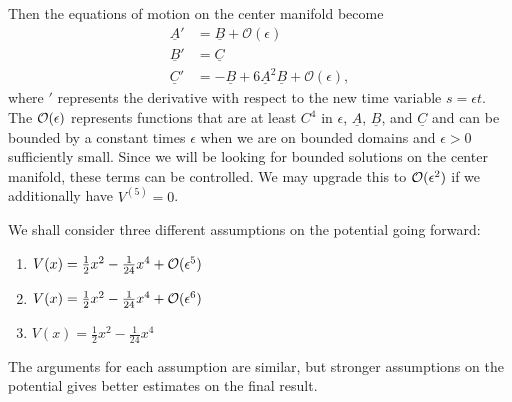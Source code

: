 Then the equations of motion on the center manifold become
\begin{equation}\label{eqns-center-manifold}
\begin{aligned}
	\underline A ' &= \underline B + \mathcal O(\epsilon) \\
	\underline B ' &= \underline C \\
	\underline C ' &= - \underline B + 6 \underline A^2 \underline B + \mathcal O(\epsilon),
\end{aligned}
\end{equation}
where \('\) represents the derivative with respect to the new time variable \(s = \epsilon t\). The \(\mathcal{O}(\epsilon)\) represents functions that are at least \(C^4\) in \(\epsilon\), \(\underline A\), \(\underline B\), and \(\underline C\) and can be bounded by a constant times \(\epsilon\) when we are on bounded domains and \(\epsilon >0\) sufficiently small. Since we will be looking for bounded solutions on the center manifold, these terms can be controlled. We may upgrade this to \(\mathcal{O}(\epsilon^2)\) if we additionally have \(V^{(5)} = 0\).

We shall consider three different assumptions on the potential going forward:
\begin{enumerate}[label = (H\arabic*)]
	\item \(V(x) = \frac 12 x^2 - \frac 1 {24} x^4 + \mathcal{O}(\epsilon^5)\)
	\item \(V(x) = \frac 12 x^2 - \frac 1 {24} x^4 + \mathcal{O}(\epsilon^6)\)
	\item \(V(x) = \frac 12 x^2 - \frac 1 {24} x^4\)
\end{enumerate}
The arguments for each assumption are similar, but stronger assumptions on the potential gives better estimates on the final result.

